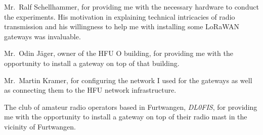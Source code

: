 Mr.\ Ralf Schellhammer, for providing me with the necessary hardware to conduct the experiments.
His motivation in explaining technical intricacies of radio transmission and his willingness to help me with installing some \ac{LoRaWAN} gateways was invaluable.

Mr.\ Odin Jäger, owner of the \ac{HFU} O building, for providing me with the opportunity to install a gateway on top of that building.

Mr.\ Martin Kramer, for configuring the network I used for the gateways as well as connecting them to the \ac{HFU} network infrastructure.

The club of amateur radio operators based in Furtwangen, \emph{DL0FIS}, for providing me with the opportunity to install a gateway on top of their radio mast in the vicinity of Furtwangen.